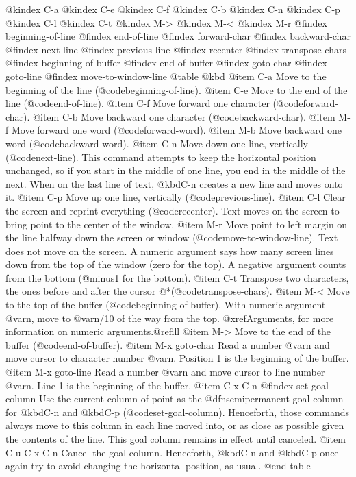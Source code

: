 {{{@kindex C-a
@kindex C-e
@kindex C-f
@kindex C-b
@kindex C-n
@kindex C-p
@kindex C-l
@kindex C-t
@kindex M->
@kindex M-<
@kindex M-r
@findex beginning-of-line
@findex end-of-line
@findex forward-char
@findex backward-char
@findex next-line
@findex previous-line
@findex recenter
@findex transpose-chars
@findex beginning-of-buffer
@findex end-of-buffer
@findex goto-char
@findex goto-line
@findex move-to-window-line
@table @kbd
@item C-a
Move to the beginning of the line (@code{beginning-of-line}).
@item C-e
Move to the end of the line (@code{end-of-line}).
@item C-f
Move forward one character (@code{forward-char}).
@item C-b
Move backward one character (@code{backward-char}).
@item M-f
Move forward one word (@code{forward-word}).
@item M-b
Move backward one word (@code{backward-word}).
@item C-n
Move down one line, vertically (@code{next-line}).  This command
attempts to keep the horizontal position unchanged, so if you start in
the middle of one line, you end in the middle of the next.  When on
the last line of text, @kbd{C-n} creates a new line and moves onto it.
@item C-p
Move up one line, vertically (@code{previous-line}).
@item C-l
Clear the screen and reprint everything (@code{recenter}).  Text moves
on the screen to bring point to the center of the window.
@item M-r
Move point to left margin on the line halfway down the screen or
window (@code{move-to-window-line}).  Text does not move on the
screen.  A numeric argument says how many screen lines down from the
top of the window (zero for the top).  A negative argument counts from
the bottom (@minus{}1 for the bottom).
@item C-t
Transpose two characters, the ones before and after the cursor
@*(@code{transpose-chars}).
@item M-<
Move to the top of the buffer (@code{beginning-of-buffer}).  With
numeric argument @var{n}, move to @var{n}/10 of the way from the top.
@xref{Arguments}, for more information on numeric arguments.@refill
@item M->
Move to the end of the buffer (@code{end-of-buffer}).
@item M-x goto-char
Read a number @var{n} and move cursor to character number @var{n}.
Position 1 is the beginning of the buffer.
@item M-x goto-line
Read a number @var{n} and move cursor to line number @var{n}.  Line 1
is the beginning of the buffer.
@item C-x C-n
@findex set-goal-column
Use the current column of point as the @dfn{semipermanent goal column} for
@kbd{C-n} and @kbd{C-p} (@code{set-goal-column}).  Henceforth, those
commands always move to this column in each line moved into, or as
close as possible given the contents of the line.  This goal column remains
in effect until canceled.
@item C-u C-x C-n
Cancel the goal column.  Henceforth, @kbd{C-n} and @kbd{C-p} once
again try to avoid changing the horizontal position, as usual.
@end table

}}}
